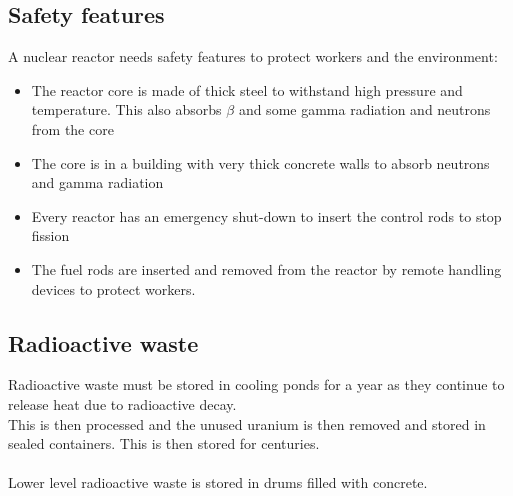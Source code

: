 \documentclass{article}[18pt]
\begin{document}
\subsection{Safety features}
A nuclear reactor needs safety features to protect workers and the environment:
\begin{itemize}
\item The reactor core is made of thick steel to withstand high pressure and temperature. This also absorbs $\beta$ and some gamma radiation and neutrons from the core
\item The core is in a building with very thick concrete walls to absorb neutrons and gamma radiation
\item Every reactor has an emergency shut-down to insert the control rods to stop fission
\item The fuel rods are inserted and removed from the reactor by remote handling devices to protect workers.
\end{itemize}
\subsection{Radioactive waste}
Radioactive waste must be stored in cooling ponds for a year as they continue to release heat due to radioactive decay.\\
This is then processed and the unused uranium is then removed and stored in sealed containers. This is then stored for centuries.\\
\\
Lower level radioactive waste is stored in drums filled with concrete.
\end{document}
